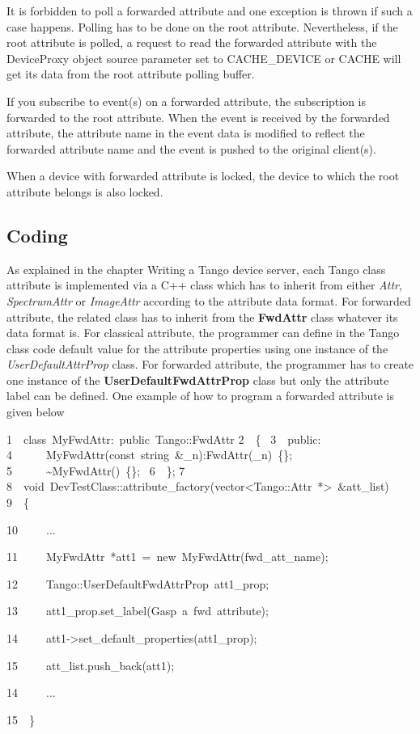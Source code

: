 It is forbidden to poll a forwarded attribute and one exception is
thrown if such a case happens. Polling has to be done on the root
attribute. Nevertheless, if the root attribute is polled, a request
to read the forwarded attribute with the DeviceProxy object source
parameter set to CACHE\_DEVICE or CACHE will get its data from the
root attribute polling buffer.

If you subscribe to event(s) on a forwarded attribute, the subscription
is forwarded to the root attribute. When the event is received by
the forwarded attribute, the attribute name in the event data is modified
to reflect the forwarded attribute name and the event is pushed to
the original client(s).

When a device with forwarded attribute is locked, the device to which
the root attribute belongs is also locked.

\subsection{Coding}

As explained in the chapter \textquotedbl{}Writing a Tango device
server\textquotedbl{}, each Tango class attribute is implemented via
a C++ class which has to inherit from either \emph{Attr}, \emph{SpectrumAttr}
or \emph{ImageAttr} according to the attribute data format. For forwarded
attribute, the related class has to inherit from the \textbf{FwdAttr}
class whatever its data format is. For classical attribute, the programmer
can define in the Tango class code default value for the attribute
properties using one instance of the \emph{UserDefaultAttrProp} class.
For forwarded attribute, the programmer has to create one instance
of the \textbf{UserDefaultFwdAttrProp}
class but only the attribute label can be defined. One example of
how to program a forwarded attribute is given below



\begin{lyxcode}
1~~class~MyFwdAttr:~public~Tango::FwdAttr
2~~\{~
3~~public:~~~~~
4~~~~~~MyFwdAttr(const~string~\&\_n):FwdAttr(\_n)~\{\};~	
5~~~~~~\textasciitilde{}MyFwdAttr()~\{\};~
6~~\};
7
8~~void~DevTestClass::attribute\_factory(vector<Tango::Attr~{*}>~\&att\_list)
9~~\{

10~~~~~...

11~~~~~MyFwdAttr~{*}att1~=~new~MyFwdAttr(\textquotedbl{}fwd\_att\_name\textquotedbl{});

12~~~~~Tango::UserDefaultFwdAttrProp~att1\_prop;~	

13~~~~~att1\_prop.set\_label(\textquotedbl{}Gasp~a~fwd~attribute\textquotedbl{});

14~~~~~att1->set\_default\_properties(att1\_prop);~	

15~~~~~att\_list.push\_back(att1);

14~~~~~...

15~~\}
\end{lyxcode}


